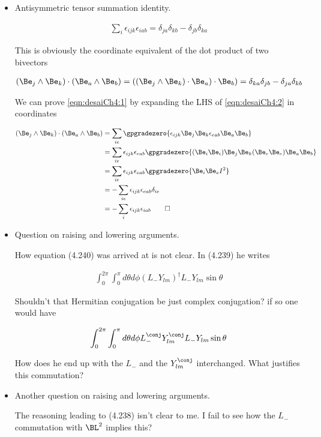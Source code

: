 \begin{itemize}
\item Antisymmetric tensor summation identity.

\begin{align}\label{eqn:desaiCh4:1}
\sum_i \epsilon_{ijk} \epsilon_{iab} = \delta_{ja} \delta_{kb} - \delta_{jb}\delta_{ka}
\end{align}

This is obviously the coordinate equivalent of the dot product of two bivectors

\begin{align}\label{eqn:desaiCh4:2}
(\Be_j \wedge \Be_k) \cdot (\Be_a \wedge \Be_b) &= 
( (\Be_j \wedge \Be_k) \cdot \Be_a ) \cdot \Be_b) = 
\delta_{ka}\delta_{jb} - \delta_{ja}\delta_{kb} 
\end{align}

We can prove \ref{eqn:desaiCh4:1} by expanding the LHS of \ref{eqn:desaiCh4:2} in coordinates

\begin{align*}
(\Be_j \wedge \Be_k) \cdot (\Be_a \wedge \Be_b) 
&= \sum_{ie} \gpgradezero{
\epsilon_{ijk} \Be_j \Be_k \epsilon_{eab} \Be_a \Be_b
} \\
&= 
\sum_{ie}
\epsilon_{ijk} \epsilon_{eab} 
\gpgradezero{
(\Be_i \Be_i) \Be_j \Be_k (\Be_e \Be_e) \Be_a \Be_b
} \\
&= 
\sum_{ie}
\epsilon_{ijk} \epsilon_{eab} 
\gpgradezero{
\Be_i \Be_e I^2
} \\
&= 
-\sum_{ie} \epsilon_{ijk} \epsilon_{eab} \delta_{ie} \\
&= 
-
\sum_i
\epsilon_{ijk} \epsilon_{iab}
\qquad\square
\end{align*}

\item Question on raising and lowering arguments.

How equation (4.240) was arrived at is not clear.  In (4.239) he writes

\begin{align*}
\int_0^{2\pi} \int_0^{\pi} d\theta d\phi 
(L_{-} Y_{lm})^\dagger
L_{-} Y_{lm} \sin\theta
\end{align*}

Shouldn't that Hermitian conjugation be just complex conjugation? if so one would have

\begin{align*}
\int_0^{2\pi} \int_0^{\pi} d\theta d\phi 
L_{-}^\conj Y_{lm}^\conj
L_{-} Y_{lm} \sin\theta
\end{align*}

How does he end up with the $L_{-}$ and the $Y_{lm}^\conj$ interchanged.  What justifies this commutation?

\item Another question on raising and lowering arguments.

The reasoning leading to (4.238) isn't clear to me.  I fail to see how the $L_{-}$ commutation with $\BL^2$ implies this?

\end{itemize}



